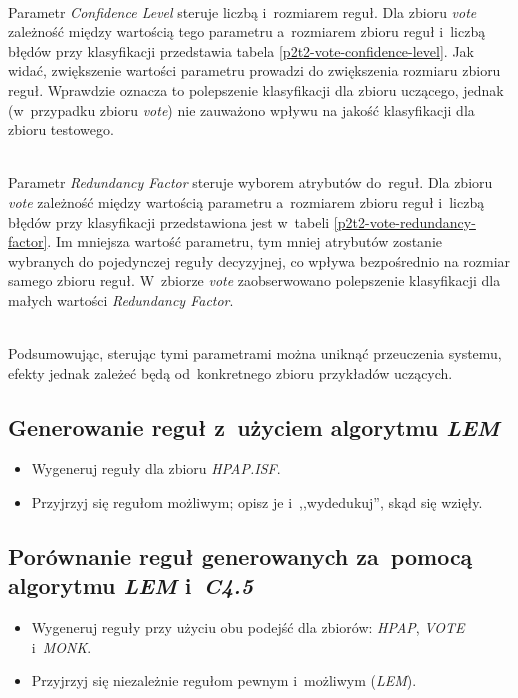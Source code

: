 \begin{itemize}
	
	\\Parametr \emph{Confidence Level} steruje liczbą i~rozmiarem reguł. Dla zbioru \emph{vote} zależność między wartością tego parametru a~rozmiarem zbioru reguł i~liczbą błędów przy klasyfikacji przedstawia tabela \ref{p2t2-vote-confidence-level}. Jak widać, zwiększenie wartości parametru prowadzi do zwiększenia rozmiaru zbioru reguł. Wprawdzie oznacza to polepszenie klasyfikacji dla zbioru uczącego, jednak (w~przypadku zbioru \emph{vote}) nie zauważono wpływu na jakość klasyfikacji dla zbioru testowego.

	
	\\Parametr \emph{Redundancy Factor} steruje wyborem atrybutów do~reguł. Dla zbioru \emph{vote} zależność między wartością parametru a~rozmiarem zbioru reguł i~liczbą błędów przy klasyfikacji przedstawiona jest w~tabeli \ref{p2t2-vote-redundancy-factor}. Im mniejsza wartość parametru, tym mniej atrybutów zostanie wybranych do pojedynczej reguły decyzyjnej, co wpływa bezpośrednio na rozmiar samego zbioru reguł. W~zbiorze \emph{vote} zaobserwowano polepszenie klasyfikacji dla małych wartości \emph{Redundancy Factor}.

	\\Podsumowując, sterując tymi parametrami można uniknąć przeuczenia systemu, efekty jednak zależeć będą od~konkretnego zbioru przykładów uczących.
\end{itemize}


	\subsection{Generowanie reguł z~użyciem algorytmu \emph{LEM}}

\begin{itemize}
\item Wygeneruj reguły dla zbioru \emph{HPAP.ISF}.
\item Przyjrzyj się regułom możliwym; opisz je i~,,wydedukuj'', skąd się wzięły.
\end{itemize}

\subsection{Porównanie reguł generowanych za~pomocą algorytmu \emph{LEM} i~\emph{C4.5}}

\begin{itemize}
\item Wygeneruj reguły przy użyciu obu podejść dla zbiorów: \emph{HPAP}, \emph{VOTE} i~\emph{MONK}.
\item Przyjrzyj się niezależnie regułom pewnym i~możliwym (\emph{LEM}).
\end{itemize}

